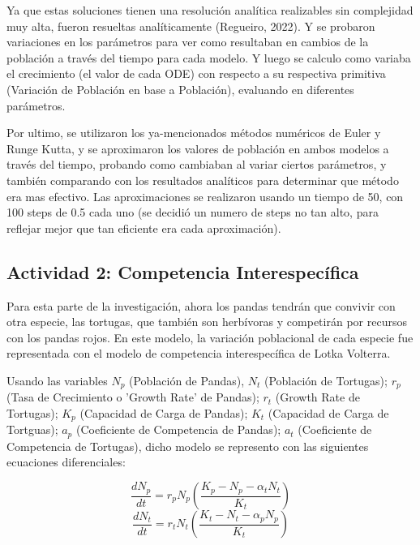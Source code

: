 \documentclass{article}
\begin{document}
\noindent Ya que estas soluciones tienen una resolución analítica realizables sin complejidad muy alta, fueron resueltas analíticamente (Regueiro, 2022). Y se probaron variaciones en los parámetros para ver como resultaban en cambios de la población a través del tiempo para cada modelo. Y luego se calculo como variaba el crecimiento (el valor de cada ODE) con respecto a su respectiva primitiva (Variación de Población en base a Población), evaluando en diferentes parámetros. \vspace{1\baselineskip}

\noindent Por ultimo, se utilizaron los ya-mencionados métodos numéricos de Euler y Runge Kutta, y se aproximaron los valores de población en ambos modelos a través del tiempo, probando como cambiaban al variar ciertos parámetros, y también comparando con los resultados analíticos para determinar que método era mas efectivo. Las aproximaciones se realizaron usando un tiempo de 50, con 100 steps de 0.5 cada uno (se decidió un numero de steps no tan alto, para reflejar mejor que tan eficiente era cada aproximación).



\subsection*{Actividad 2: Competencia Interespecífica}
\noindent Para esta parte de la investigación, ahora los pandas tendrán que convivir con otra especie, las tortugas, que también son herbívoras y competirán por recursos con los pandas rojos. En este modelo, la variación poblacional de cada especie fue representada con el modelo de competencia interespecífica de Lotka Volterra.\vspace{1\baselineskip}

\noindent Usando las variables $N_p$ (Población de Pandas), $N_t$ (Población de Tortugas); $r_p$ (Tasa de Crecimiento o 'Growth Rate' de Pandas); $r_t$ (Growth Rate de Tortugas); $K_p$ (Capacidad de Carga de Pandas); $K_t$ (Capacidad de Carga de Tortguas); $a_p$ (Coeficiente de Competencia de Pandas); $a_t$ (Coeficiente de Competencia de Tortugas), dicho modelo se represento con las siguientes ecuaciones diferenciales: \vspace{0.5\baselineskip}

\setlength{\baselineskip}{1\baselineskip}
\[\frac{dN_p}{dt} = r_p N_p \left( \frac{K_p - N_p - \alpha_{t} N_t}{K_t} \right)\]
\[\frac{dN_t}{dt} = r_t N_t \left( \frac{K_t - N_t - \alpha_{p} N_p}{K_t} \right)\]
\vspace{0.75\baselineskip}
\end{document}
